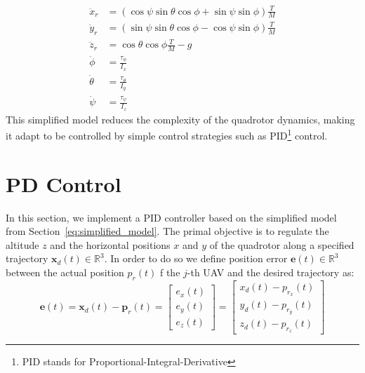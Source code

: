 \begin{subequations}
\begin{align}
    \ddot{x}_r &= (\cos\psi \sin\theta \cos\phi + \sin\psi \sin\phi) \frac{T}{M} \label{eq:position_control_x}\\[6pt] 
    \ddot{y}_r &= (\sin\psi \sin\theta \cos\phi - \cos\psi \sin\phi) \frac{T}{M} \label{eq:position_control_y}\\[6pt] 
    \ddot{z}_r &= \cos\theta \cos\phi \frac{T}{M} - g  \label{eq:position_control_z}\\[6pt] 
    \dot{\phi} &= \frac{\tau_{\phi}}{I_x} \\[8pt]
    \dot{\theta} &= \frac{\tau_{\theta}}{I_y} \\[8pt]
    \dot{\psi} &= \frac{\tau_{\psi}}{I_z}
\end{align}
\label{eq:simplified_model}
\end{subequations}
This simplified model reduces the complexity of the quadrotor dynamics,
making it adapt to be controlled by simple control strategies such as 
PID\footnote{PID stands for Proportional-Integral-Derivative} control.

\section{PD Control}
In this section, we implement a PID controller 
based on the simplified model from Section~\ref{eq:simplified_model}. 
The primal objective is to regulate the altitude $z$ and the 
horizontal positions \( x \) and \( y \) of the quadrotor along a 
specified trajectory $\mathbf{x}_d(t) \in \mathbb{R}^3$.
In order to do so we define position error $\mathbf{e}(t) \in \mathbb{R}^3$
between the actual position $p_r(t)$ f the $j$-th UAV and the desired trajectory as:
\[
    \mathbf{e}(t) = \mathbf{x}_d(t) - \mathbf{p}_r(t) = 
    \begin{bmatrix}
        e_x(t) \\
        e_y(t) \\
        e_z(t)
    \end{bmatrix} =
    \begin{bmatrix}
        x_d(t) - p_{r_x}(t) \\
        y_d(t) - p_{r_y}(t) \\
        z_d(t) - p_{r_z}(t)
    \end{bmatrix}
\]

